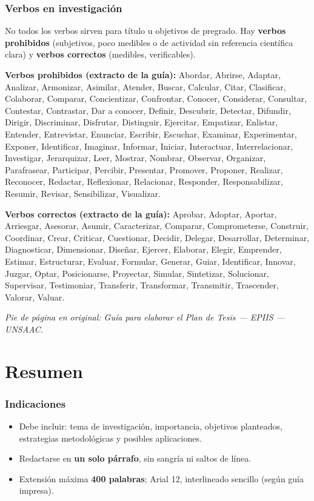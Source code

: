 \documentclass[a4paper,11pt]{book}
\begin{document}
\subsection*{Verbos en investigación}
No todos los verbos sirven para título u objetivos de pregrado. Hay \textbf{verbos prohibidos} (subjetivos, poco medibles o de actividad sin referencia científica clara) y \textbf{verbos correctos} (medibles, verificables).

\textbf{Verbos prohibidos (extracto de la guía):} Abordar, Abrirse, Adaptar, Analizar, Armonizar, Asimilar, Atender, Buscar, Calcular, Citar, Clasificar, Colaborar, Comparar, Concientizar, Confrontar, Conocer, Considerar, Consultar, Contestar, Contrastar, Dar a conocer, Definir, Descubrir, Detectar, Difundir, Dirigir, Discriminar, Disfrutar, Distinguir, Ejercitar, Empatizar, Enlistar, Entender, Entrevistar, Enunciar, Escribir, Escuchar, Examinar, Experimentar, Exponer, Identificar, Imaginar, Informar, Iniciar, Interactuar, Interrelacionar, Investigar, Jerarquizar, Leer, Mostrar, Nombrar, Observar, Organizar, Parafrasear, Participar, Percibir, Presentar, Promover, Proponer, Realizar, Reconocer, Redactar, Reflexionar, Relacionar, Responder, Responsabilizar, Resumir, Revisar, Sensibilizar, Visualizar.

\textbf{Verbos correctos (extracto de la guía):} Aprobar, Adoptar, Aportar, Arriesgar, Asesorar, Asumir, Caracterizar, Comparar, Comprometerse, Construir, Coordinar, Crear, Criticar, Cuestionar, Decidir, Delegar, Desarrollar, Determinar, Diagnosticar, Dimensionar, Diseñar, Ejercer, Elaborar, Elegir, Emprender, Estimar, Estructurar, Evaluar, Formular, Generar, Guiar, Identificar, Innovar, Juzgar, Optar, Posicionarse, Proyectar, Simular, Sintetizar, Solucionar, Supervisar, Testimoniar, Transferir, Transformar, Transmitir, Trascender, Valorar, Valuar.

\textit{Pie de página en original: Guía para elaborar el Plan de Tesis --- EPIIS --- UNSAAC.}

\chapter{Resumen}
\label{cap:resumen}

\subsection*{Indicaciones}
\begin{itemize}[leftmargin=*]
  \item Debe incluir: tema de investigación, importancia, objetivos planteados, estrategias metodológicas y posibles aplicaciones.
  \item Redactarse en \textbf{un solo párrafo}, sin sangría ni saltos de línea.
  \item Extensión máxima \textbf{400 palabras}; Arial 12, interlineado sencillo (según guía impresa).
\end{itemize}
\end{document}

